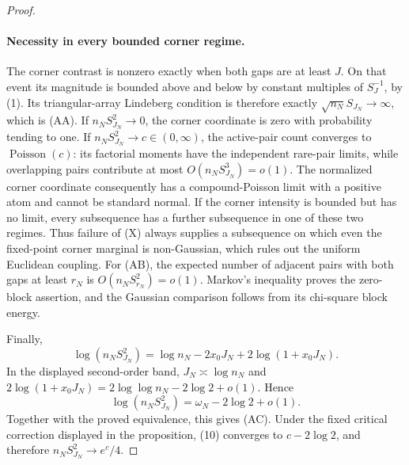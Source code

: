 \begin{proof}
\paragraph{Necessity in every bounded corner regime.}
The corner contrast is nonzero exactly when both gaps are at least $J$.
On that event its magnitude is bounded above and below by constant multiples
of $S_J^{-1}$, by \textup{(1)}.  Its triangular-array Lindeberg condition is
therefore exactly $\sqrt{n_N}S_{J_N}\to\infty$, which is \textup{(AA)}.
If $n_NS_{J_N}^2\to0$, the corner coordinate is zero with probability tending
to one.  If $n_NS_{J_N}^2\to c\in(0,\infty)$, the active-pair count converges
to $\operatorname{Poisson}(c)$: its factorial moments have the independent
rare-pair limits, while overlapping pairs contribute at most
$O(n_NS_{J_N}^3)=o(1)$.  The normalized corner coordinate consequently has
a compound-Poisson limit with a positive atom and cannot be standard normal.
If the corner intensity is bounded but has no limit, every subsequence has a
further subsequence in one of these two regimes.  Thus failure of
\textup{(X)} always supplies a subsequence on which even the fixed-point
corner marginal is non-Gaussian, which rules out the uniform Euclidean
coupling.  For \textup{(AB)}, the expected number of adjacent pairs with both
gaps at least $r_N$ is $O(n_NS_{r_N}^2)=o(1)$.  Markov's inequality proves
the zero-block assertion, and the Gaussian comparison follows from its
chi-square block energy.

Finally,
\[
 \log(n_NS_{J_N}^2)
 =\log n_N-2x_0J_N+2\log(1+x_0J_N).
 \tag{10}
\]
In the displayed second-order band,
$J_N\asymp\log n_N$ and
$2\log(1+x_0J_N)=2\log\log n_N-2\log2+o(1)$.
Hence
\[
 \log(n_NS_{J_N}^2)=\omega_N-2\log2+o(1).
\]
Together with the proved equivalence, this gives \textup{(AC)}.  Under the
fixed critical correction displayed in the proposition, \textup{(10)}
converges to $c-2\log2$, and therefore
$n_NS_{J_N}^2\to e^c/4$.
\end{proof}

